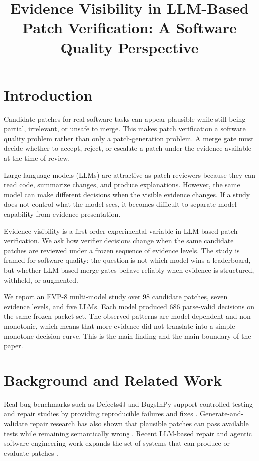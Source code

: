 \documentclass[pdflatex,sn-basic]{sn-jnl}
\title[Evidence Visibility in LLM-Based Patch Verification]{Evidence Visibility in LLM-Based Patch Verification: A Software Quality Perspective}
\author*[1]{\fnm{Anonymous} \sur{Author}}\email{anonymous@example.com}
\affil*[1]{\orgdiv{Anonymous Department}, \orgname{Anonymous Institution}, \country{Anonymous}}
\begin{document}
\maketitle

\section{Introduction}

Candidate patches for real software tasks can appear plausible while still
being partial, irrelevant, or unsafe to merge. This makes patch verification a
software quality problem rather than only a patch-generation problem. A merge
gate must decide whether to accept, reject, or escalate a patch under the
evidence available at the time of review.

Large language models (LLMs) are attractive as patch reviewers because they can
read code, summarize changes, and produce explanations. However, the same
model can make different decisions when the visible evidence changes. If a
study does not control what the model sees, it becomes difficult to separate
model capability from evidence presentation.

Evidence visibility is a first-order experimental variable
in LLM-based patch verification. We ask how verifier decisions change when the
same candidate patches are reviewed under a frozen sequence of evidence
levels. The study is framed for software quality: the question is not which
model wins a leaderboard, but whether LLM-based merge gates behave reliably
when evidence is structured, withheld, or augmented.

We report an EVP-8 multi-model study over 98 candidate patches, seven evidence
levels, and five LLMs. Each model produced 686 parse-valid decisions on the
same frozen packet set. The observed patterns are model-dependent and
non-monotonic, which means that more evidence did not translate into a simple
monotone decision curve. This is the main finding and the main boundary of the
paper.

\section{Background and Related Work}

Real-bug benchmarks such as Defects4J and BugsInPy support controlled testing
and repair studies by providing reproducible failures and fixes
\cite{just2014defects4j,widyasari2020bugsinpy}. Generate-and-validate repair
research has also shown that plausible patches can pass available tests while
remaining semantically wrong \cite{qi2015patchcorrectness}. Recent LLM-based
repair and agentic software-engineering work expands the set of systems that
can produce or evaluate patches \cite{xia2023llmapr,jimenez2024swebench}.
\end{document}
